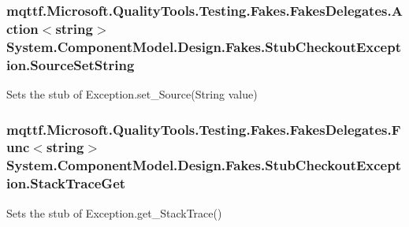 \hypertarget{class_system_1_1_component_model_1_1_design_1_1_fakes_1_1_stub_checkout_exception_a257edc7586a8ef2647f8c66a57f88d13}{
\subsubsection[{Source\-Set\-String}]{\setlength{\rightskip}{0pt plus 5cm}mqttf.\-Microsoft.\-Quality\-Tools.\-Testing.\-Fakes.\-Fakes\-Delegates.\-Action$<$string$>$ System.\-Component\-Model.\-Design.\-Fakes.\-Stub\-Checkout\-Exception.\-Source\-Set\-String}}\label{class_system_1_1_component_model_1_1_design_1_1_fakes_1_1_stub_checkout_exception_a257edc7586a8ef2647f8c66a57f88d13}


Sets the stub of Exception.\-set\-\_\-\-Source(\-String value)

\hypertarget{class_system_1_1_component_model_1_1_design_1_1_fakes_1_1_stub_checkout_exception_a830e977e54a34c54c4834e8c946c4109}{
\subsubsection[{Stack\-Trace\-Get}]{\setlength{\rightskip}{0pt plus 5cm}mqttf.\-Microsoft.\-Quality\-Tools.\-Testing.\-Fakes.\-Fakes\-Delegates.\-Func$<$string$>$ System.\-Component\-Model.\-Design.\-Fakes.\-Stub\-Checkout\-Exception.\-Stack\-Trace\-Get}}\label{class_system_1_1_component_model_1_1_design_1_1_fakes_1_1_stub_checkout_exception_a830e977e54a34c54c4834e8c946c4109}


Sets the stub of Exception.\-get\-\_\-\-Stack\-Trace()

